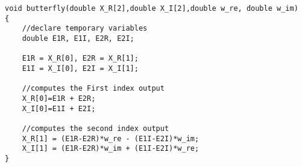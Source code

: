 
\lstset{framesep=-10pt, xleftmargin=-10pt}
\begin{lstlisting}[caption={Sample Code to Implement Butterfly Structure},label={listing:2}]
void butterfly(double X_R[2],double X_I[2],double w_re, double w_im)
{   
    //declare temporary variables
    double E1R, E1I, E2R, E2I;
    
    E1R = X_R[0], E2R = X_R[1];
    E1I = X_I[0], E2I = X_I[1];
    
    //computes the First index output
    X_R[0]=E1R + E2R;
    X_I[0]=E1I + E2I;
    
    //computes the second index output
    X_R[1] = (E1R-E2R)*w_re - (E1I-E2I)*w_im;
    X_I[1] = (E1R-E2R)*w_im + (E1I-E2I)*w_re;
}
\end{lstlisting}

